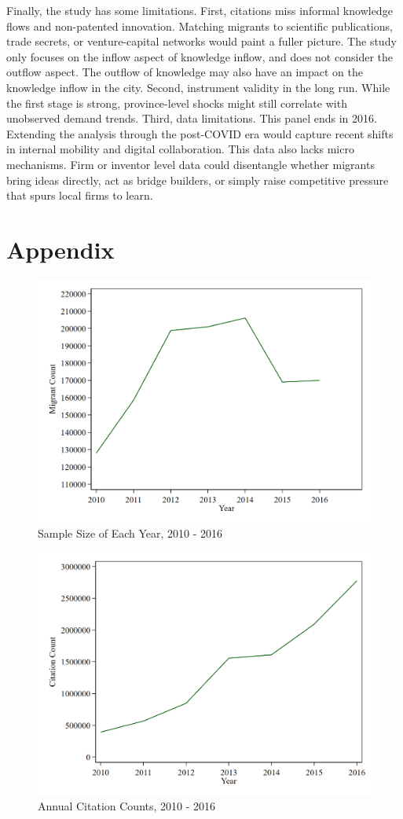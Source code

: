 \documentclass[12pt]{article}
\begin{document}
Finally, the study has some limitations. First, citations miss informal knowledge flows and non-patented innovation. Matching migrants to scientific publications, trade secrets, or venture-capital networks would paint a fuller picture. The study only focuses on the inflow aspect of knowledge inflow, and does not consider the outflow aspect. The outflow of knowledge may also have an impact on the knowledge inflow in the city. Second, instrument validity in the long run. While the first stage is strong, province-level shocks might still correlate with unobserved demand trends. Third, data limitations. This panel ends in 2016. Extending the analysis through the post-COVID era would capture recent shifts in internal mobility and digital collaboration. This data also lacks micro mechanisms. Firm or inventor level data could disentangle whether migrants bring ideas directly, act as bridge builders, or simply raise competitive pressure that spurs local firms to learn.




\clearpage
{}





\clearpage

\section*{Appendix} \label{sec:appendixa}
\begin{figure}[h]
  \centering
  \includegraphics[width=.6\textwidth]{../Analysis/output/sample_size.png}
  \caption{Sample Size of Each Year, 2010 - 2016}
\end{figure}


\begin{figure}[h]
  \centering
  \includegraphics[width=.6\textwidth]{../Analysis/output/Citation_over_time.png}
  \caption{Annual Citation Counts, 2010 - 2016}
\end{figure}
\end{document}
